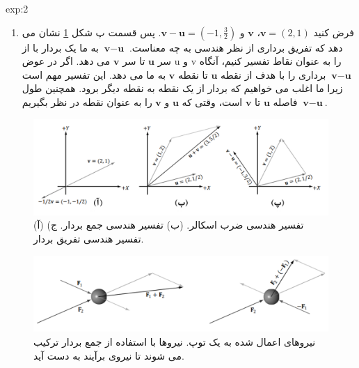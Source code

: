{\begin{spacing}{1.5}
\begin{example}{exp:2}
\begin{enumerate}
                \item {فرض کنید $\textbf{v}=(2,1)$، $\textbf{v}$ و $\textbf{v}-\textbf{u}=(-1,\frac{\displaystyle 3}{\displaystyle 2})$. پس
                قسمت پ شکل \ref{fig:4.Session.1.1.6} نشان می دهد که تفریق برداری از نظر هندسی به چه معناست.
                    $\textbf{v}-\textbf{u}$ به ما یک بردار با از سر $\textbf{u}$ تا سر $\textbf{v}$ می دهد.
                    اگر در عوض u و v را به عنوان نقاط تفسیر کنیم، آنگاه $\textbf{v}-\textbf{u}$ برداری را با هدف از نقطه $\textbf{u}$ تا نقطه $\textbf{v}$ به ما می دهد.
                    این تفسیر مهم است زیرا ما اغلب می خواهیم که بردار از یک نقطه به نقطه دیگر برود.
                    همچنین طول $\textbf{v}-\textbf{u}$ فاصله $\textbf{u}$ تا $\textbf{v}$ است، وقتی که $\textbf{u}$ و $\textbf{v}$ را به عنوان نقطه در نظر بگیریم.}
            \end{enumerate}

            \begin{figure}[H]
                \centering
                \setlength{\belowcaptionskip}{-10pt}
                \includegraphics[width=\textwidth]{Images/4/4.Session.1.1.6}
                \caption{(آ) تفسیر هندسی ضرب اسکالر. (ب) تفسیر هندسی جمع بردار. ج) تفسیر هندسی تفریق بردار.}
                \label{fig:4.Session.1.1.6}
            \end{figure}

            \begin{figure}[H]
                \centering
                \setlength{\belowcaptionskip}{-10pt}
                \includegraphics[width=\textwidth]{Images/4/4.Session.1.1.7}
                \caption{نیروهای اعمال شده به یک توپ. نیروها با استفاده از جمع بردار ترکیب می شوند تا نیروی برآیند به دست آید. \textbf{\vspace{10pt}}}
                \label{fig:4.Session.1.1.7}
            \end{figure}
        \end{example}
    \end{spacing}
}


